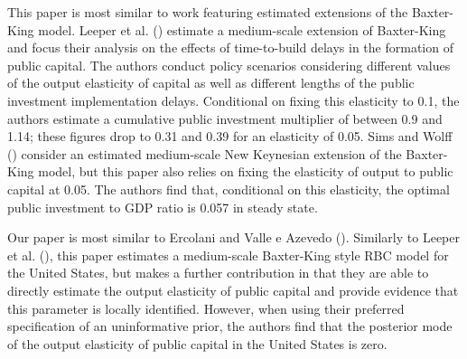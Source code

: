 \documentclass[titlepage, 11pt, a4paper]{article}
\renewcommand{\&}{and}
\begin{document}





This paper is most similar to work featuring estimated extensions of the Baxter-King model. Leeper et al. (\citeyear{leeper2010government}) estimate a medium-scale extension of Baxter-King and focus their analysis on the effects of time-to-build delays in the formation of public capital. The authors conduct policy scenarios considering different values of the output elasticity of capital as well as different lengths of the public investment implementation delays. Conditional on fixing this elasticity to 0.1, the authors estimate a cumulative public investment multiplier of between 0.9 and 1.14; these figures drop to 0.31 and 0.39 for an elasticity of 0.05. Sims and Wolff (\citeyear{sims2018output}) consider an estimated medium-scale New Keynesian extension of the Baxter-King model, but this paper also relies on fixing the elasticity of output to public capital at 0.05. The authors find that, conditional on this elasticity, the optimal public investment to GDP ratio is 0.057 in steady state. 


Our paper is most similar to Ercolani and Valle e Azevedo (\citeyear{ercolani2014effects}). Similarly to Leeper et al. (\citeyear{leeper2010government}), this paper estimates a medium-scale Baxter-King style RBC model for the United States, but makes a further contribution in that they are able to directly estimate the output elasticity of public capital and provide evidence that this parameter is locally identified. However, when using their preferred specification of an uninformative prior, the authors find that the posterior mode of the output elasticity of public capital in the United States is zero. 
\end{document}
